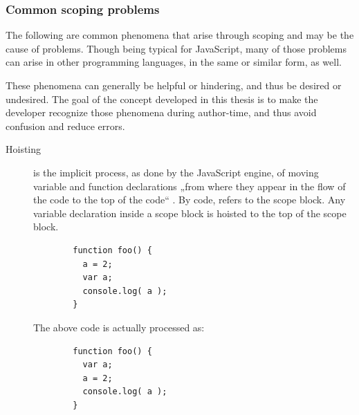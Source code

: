 \subsubsection{Common scoping problems}\label{common-scoping-problems}

The following are common phenomena that arise through scoping and may be
the cause of problems. Though being typical for JavaScript, many of
those problems can arise in other programming languages, in the same or
similar form, as well.

These phenomena can generally be helpful or hindering, and thus be
desired or undesired. The goal of the concept developed in this thesis
is to make the developer recognize those phenomena during author-time,
and thus avoid confusion and reduce errors.

\begin{description}
\item[Hoisting]
is the implicit process, as done by the JavaScript engine, of moving
variable and function declarations „from where they appear in the flow
of the code to the top of the code“ \cite{getify}. By code,
 refers to the scope block. Any variable declaration
inside a scope block is hoisted to the top of the scope block.

\begin{verbatim}
        function foo() {
          a = 2;
          var a;
          console.log( a );
        }
\end{verbatim}

The above code is actually processed as:

\begin{verbatim}
        function foo() {
          var a;
          a = 2;
          console.log( a );
        }
\end{verbatim}


\end{description}
